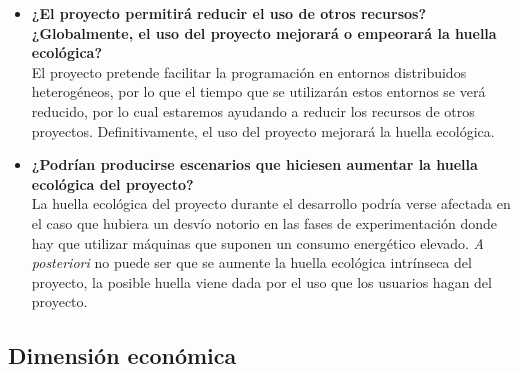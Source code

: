 \begin{itemize}
	\item \textbf{¿El proyecto permitirá reducir el uso de otros recursos? ¿Globalmente, el uso del proyecto
		mejorará o empeorará la huella ecológica?} \\
	
	El proyecto pretende facilitar la programación en entornos distribuidos heterogéneos, por lo que el tiempo que se utilizarán estos entornos se verá reducido, por lo cual estaremos ayudando a reducir los recursos de otros proyectos. Definitivamente, el uso del proyecto mejorará la huella ecológica.
	
	\item \textbf{¿Podrían producirse escenarios que hiciesen aumentar la huella ecológica del proyecto?} \\
	
	La huella ecológica del proyecto durante el desarrollo podría verse afectada en el caso que hubiera un desvío notorio en las fases de experimentación donde hay que utilizar máquinas que suponen un consumo energético elevado. \textit{A posteriori} no puede ser que se aumente la huella ecológica intrínseca del proyecto, la posible huella viene dada por el uso que los usuarios hagan del proyecto.
	
	
\end{itemize}

\subsection{Dimensión económica}

